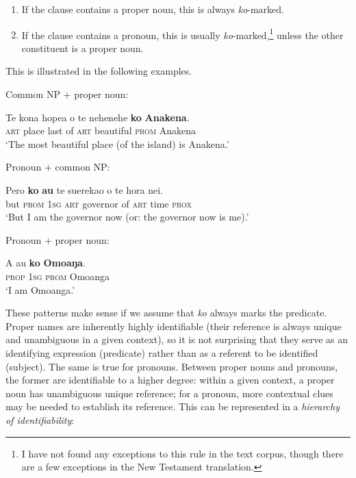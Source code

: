 \begin{enumerate}
\item 
If the clause contains a proper noun, this is always \textit{ko}{}-marked.

\item 
If the clause contains a pronoun, this is usually \textit{ko}{}-marked,\footnote{\label{fn:462}I have not found any exceptions to this rule in the text corpus, though there are a few exceptions in the New Testament translation.} unless the other constituent is a proper noun.

\end{enumerate}

This is illustrated in the following examples.

Common NP + proper noun:

\ea\label{ex:9.12}
\gll Te kona hope{\ꞌ}a o te nehenehe \textbf{ko} \textbf{{\ꞌ}Anakena}. \\
\textsc{art} place last of \textsc{art} beautiful \textsc{prom} Anakena \\

\glt
‘The most beautiful place (of the island) is Anakena.’ \textstyleExampleref{[R350.013]} 
\z

Pronoun + common NP:

\ea\label{ex:9.13}
\gll Pero \textbf{ko} \textbf{au} te suerekao o te hora nei. \\
but \textsc{prom} \textsc{1sg} \textsc{art} governor of \textsc{art} time \textsc{prox} \\

\glt
‘But I am the governor now (or: the governor now is me).’ \textstyleExampleref{[R201.007]} 
\z

Pronoun + proper noun:

\ea\label{ex:9.14}
\gll A au \textbf{ko} \textbf{Omoaŋa}. \\
\textsc{prop} \textsc{1sg} \textsc{prom} Omoanga \\

\glt
‘I am Omoanga.’ \textstyleExampleref{[R314.101]} 
\z

These patterns make sense if we assume that \textit{ko} always marks the predicate. Proper names are inherently highly identifiable (their reference is always unique and unambiguous in a given context), so it is not surprising that they serve as an identifying expression (predicate) rather than as a referent to be identified (subject). The same is true for pronouns. Between proper nouns and pronouns, the former are identifiable to a higher degree: within a given context, a proper noun has unambiguous unique reference; for a pronoun, more contextual clues may be needed to establish its reference. This can be represented in a \textit{hierarchy of identifiability}:

